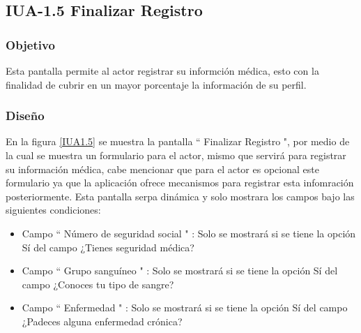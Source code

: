 \subsection{IUA-1.5 Finalizar Registro}

\subsubsection{Objetivo}

	
 Esta pantalla permite al actor registrar su informción médica, esto con la finalidad de cubrir en un mayor porcentaje la información de su perfil.

\subsubsection{Diseño}


    En la figura \ref{IUA1.5} se muestra la pantalla `` Finalizar Registro ", por medio de la cual se muestra un formulario para el actor, mismo que servirá para registrar su información médica, cabe mencionar que para el actor es opcional este formulario ya que la aplicación ofrece mecanismos para registrar esta infomración posteriormente. Esta pantalla serpa dinámica y solo mostrara los campos bajo las siguientes condiciones:\\

    \begin{itemize}
        \item Campo `` Número de seguridad social " : Solo se mostrará si se tiene la opción Sí del campo ¿Tienes seguridad médica?
        \item Campo `` Grupo sanguíneo " : Solo se mostrará si se tiene la opción Sí del campo ¿Conoces tu tipo de sangre?
        \item Campo `` Enfermedad " : Solo se mostrará si se tiene la opción Sí del campo ¿Padeces alguna enfermedad crónica?
    \end{itemize}
    


